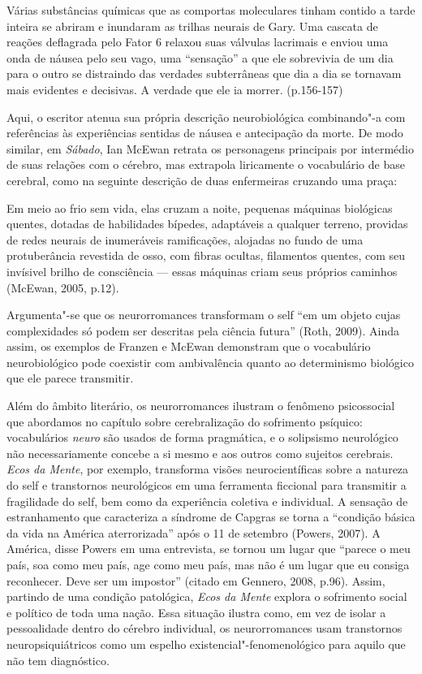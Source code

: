 Várias substâncias químicas que as comportas moleculares tinham contido
a tarde inteira se abriram e inundaram as trilhas neurais de Gary. Uma
cascata de reações deflagrada pelo Fator 6 relaxou suas válvulas
lacrimais e enviou uma onda de náusea pelo seu vago, uma ``sensação'' a
que ele sobrevivia de um dia para o outro se distraindo das verdades
subterrâneas que dia a dia se tornavam mais evidentes e decisivas. A
verdade que ele ia morrer. (p.156-157)

Aqui, o escritor atenua sua própria descrição neurobiológica
combinando"-a com referências às experiências sentidas de náusea e
antecipação da morte. De modo similar, em \emph{Sábado}, Ian McEwan
retrata os personagens principais por intermédio de suas relações com o
cérebro, mas extrapola liricamente o vocabulário de base cerebral, como
na seguinte descrição de duas enfermeiras cruzando uma praça:

Em meio ao frio sem vida, elas cruzam a noite, pequenas máquinas
biológicas quentes, dotadas de habilidades bípedes, adaptáveis a
qualquer terreno, providas de redes neurais de inumeráveis ramificações,
alojadas no fundo de uma protuberância revestida de osso, com fibras
ocultas, filamentos quentes, com seu invísivel brilho de consciência ---
essas máquinas criam seus próprios caminhos (McEwan, 2005, p.12).

Argumenta"-se que os neurorromances transformam o self ``em um objeto
cujas complexidades só podem ser descritas pela ciência futura'' (Roth,
2009). Ainda assim, os exemplos de Franzen e McEwan demonstram que o
vocabulário neurobiológico pode coexistir com ambivalência quanto ao
determinismo biológico que ele parece transmitir.

Além do âmbito literário, os neurorromances ilustram o fenômeno
psicossocial que abordamos no capítulo sobre cerebralização do
sofrimento psíquico: vocabulários \emph{neuro} são usados de forma
pragmática, e o solipsismo neurológico não necessariamente concebe a si
mesmo e aos outros como sujeitos cerebrais. \emph{Ecos da Mente}, por
exemplo, transforma visões neurocientíficas sobre a natureza do self e
transtornos neurológicos em uma ferramenta ficcional para transmitir a
fragilidade do self, bem como da experiência coletiva e individual. A
sensação de estranhamento que caracteriza a síndrome de Capgras se torna
a ``condição básica da vida na América aterrorizada'' após o 11 de
setembro (Powers, 2007). A América, disse Powers em uma entrevista, se
tornou um lugar que ``parece o meu país, soa como meu país, age como meu
país, mas não é um lugar que eu consiga reconhecer. Deve ser um
impostor'' (citado em Gennero, 2008, p.96). Assim, partindo de uma
condição patológica, \emph{Ecos da Mente} explora o sofrimento social e
político de toda uma nação. Essa situação ilustra como, em vez de isolar
a pessoalidade dentro do cérebro individual, os neurorromances usam
transtornos neuropsiquiátricos como um espelho
existencial"-fenomenológico para aquilo que não tem diagnóstico.

